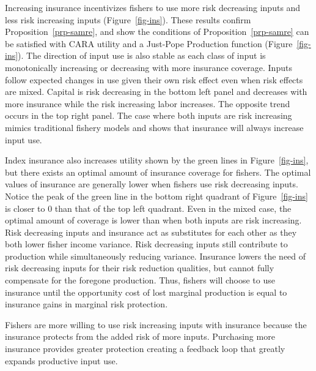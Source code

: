\documentclass[
  letterpaper,
  DIV=11,
  numbers=noendperiod]{scrartcl}
\theoremstyle{plain}
\theoremstyle{plain}
\theoremstyle{remark}
\begin{document}
Increasing insurance incentivizes fishers to use more risk decreasing
inputs and less risk increasing inputs (Figure~\ref{fig-ins}). These
results confirm Proposition~\ref{prp-samre}, and show the conditions of
Proposition~\ref{prp-samre} can be satisfied with CARA utility and a
Just-Pope Production function (Figure~\ref{fig-ins}). The direction of
input use is also stable as each class of input is monotonically
increasing or decreasing with more insurance coverage. Inputs follow
expected changes in use given their own risk effect even when risk
effects are mixed. Capital is risk decreasing in the bottom left panel
and decreases with more insurance while the risk increasing labor
increases. The opposite trend occurs in the top right panel. The case
where both inputs are risk increasing mimics traditional fishery models
and shows that insurance will always increase input use.

Index insurance also increases utility shown by the green lines in
Figure~\ref{fig-ins}, but there exists an optimal amount of insurance
coverage for fishers. The optimal values of insurance are generally
lower when fishers use risk decreasing inputs. Notice the peak of the
green line in the bottom right quadrant of Figure~\ref{fig-ins} is
closer to 0 than that of the top left quadrant. Even in the mixed case,
the optimal amount of coverage is lower than when both inputs are risk
increasing. Risk decreasing inputs and insurance act as substitutes for
each other as they both lower fisher income variance. Risk decreasing
inputs still contribute to production while simultaneously reducing
variance. Insurance lowers the need of risk decreasing inputs for their
risk reduction qualities, but cannot fully compensate for the foregone
production. Thus, fishers will choose to use insurance until the
opportunity cost of lost marginal production is equal to insurance gains
in marginal risk protection.

Fishers are more willing to use risk increasing inputs with insurance
because the insurance protects from the added risk of more inputs.
Purchasing more insurance provides greater protection creating a
feedback loop that greatly expands productive input use.
\end{document}

